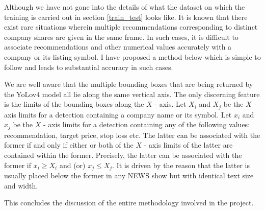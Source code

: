 Although we have not gone into the details of what the dataset on which the training is carried out in section \ref{train_test} looks like. It is known that there exist rare situations wherein multiple recommendations corresponding to distinct company shares are given in the same frame. In such cases, it is difficult to associate recommendations and other numerical values accurately with a company or its listing symbol. I have proposed a method below which is simple to follow and leads to substantial accuracy in such cases. \par

We are well aware that the multiple bounding boxes that are being returned by the YoLov4 model all lie along the same vertical axis. The only discerning feature is the limits of the bounding boxes along the $X$ - axis. Let $X_i$ and $X_j$ be the $X$ - axis limits for a detection containing a company name or its symbol. Let $x_i$ and $x_j$ be the $X$ - axis limits for a detection containing any of the following values: recommendation, target price, stop loss etc. The latter can be associated with the former if and only if either or both of the $X$ - axis limits of the latter are contained within the former. Precisely, the latter can be associated with the former if $x_{i} \geqslant X_{i}$ and (or)  $x_{j} \leqslant X_{j}$. It is driven by the reason that the latter is usually placed below the former in any NEWS show but with identical text size and width. \par

This concludes the discussion of the entire methodology involved in the project.

